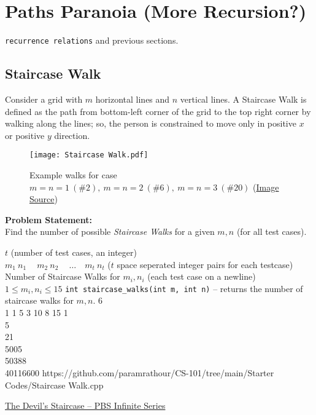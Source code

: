 \section{Paths Paranoia (More Recursion?)}{\label{sec:paths}}
\begin{topics}
\verb!recurrence relations! and previous sections.
\end{topics}	
\subsection{Staircase Walk}{\label{pp:staircasewalk}}
Consider a grid with $m$ horizontal lines and $n$ vertical lines. A Staircase Walk is defined as the path from bottom-left corner of the grid to the top right corner by walking along the lines; so, the person is constrained to move only in positive $x$ or positive $y$ direction.
\begin{figure}[H]
	\centering
	\texttt{[image: Staircase Walk.pdf]}
	\caption{Example walks for case $m=n=1\ (\#2),\ m=n=2\ (\#6),\ m=n=3\ (\#20)$ (\href{https://mathworld.wolfram.com/StaircaseWalk.html}{Image Source})}
	\label{fig:staircasewalk}
\end{figure}
\vspace{-1em}
\textbf{Problem Statement:}\\
Find the number of possible \emph{Staircase Walks} for a given $m,n$ (for all test cases).
\begin{testcasesFunction}
	{$t$ \hfill(number of test cases, an integer)\\
	$m_1\ n_1\ \quad m_2\ n_2\ \quad \ldots\quad m_t\ n_t$ \hfill($t$ space seperated integer pairs for each testcase)}
	{Number of Staircase Walks for $m_i, n_i$  \hfill(each test case on a newline)}
	{$1 \leq m_i, n_i \leq 15$}
	{\texttt{int staircase\_walks(int m, int n)} -- returns the number of staircase walks for $m,n$.}
	{6\\1 1 5 3 10 8 15}
	{1\\5\\21\\5005\\50388\\40116600}
	{https://github.com/paramrathour/CS-101/tree/main/Starter Codes/Staircase Walk.cpp}
\end{testcasesFunction}
\begin{funvideo}
\href{https://youtu.be/dQXVn7pFsVI}{The Devil's Staircase -- PBS Infinite Series}
\end{funvideo}
